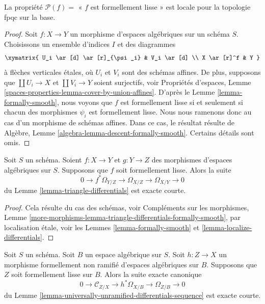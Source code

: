 \begin{lemma}
\label{lemma-descending-property-formally-smooth}
La propriété $\mathcal{P}(f) =$ « $f$ est formellement lisse »
est locale pour la topologie fpqc sur la base.
\end{lemma}

\begin{proof}
Soit $f : X \to Y$ un morphisme d'espaces algébriques sur un schéma $S$.
Choisissons un ensemble d'indices $I$ et des diagrammes
$$
\xymatrix{
U_i \ar[d] \ar[r]_{\psi_i} & V_i \ar[d] \\
X \ar[r]^f & Y
}
$$
à flèches verticales étales, où $U_i$ et $V_i$ sont des schémas affines. De plus,
supposons que $\coprod U_i \to X$ et $\coprod V_i \to Y$ soient surjectifs, voir
Propriétés d'espaces,
Lemme \ref{spaces-properties-lemma-cover-by-union-affines}.
D'après le
Lemme \ref{lemma-formally-smooth},
nous voyons que $f$ est formellement lisse si et seulement si chacun des morphismes
$\psi_i$ est formellement lisse. Nous nous ramenons donc au cas d'un morphisme
de schémas affines. Dans ce cas, le résultat résulte de
Algèbre, Lemme \ref{algebra-lemma-descent-formally-smooth}.
Certains détails sont omis.
\end{proof}

\begin{lemma}
\label{lemma-triangle-differentials-formally-smooth}
Soit $S$ un schéma.
Soient $f : X \to Y$ et $g : Y \to Z$ des morphismes d'espaces algébriques sur $S$.
Supposons que $f$ soit formellement lisse. Alors la suite
$$
0 \to f^*\Omega_{Y/Z} \to \Omega_{X/Z} \to \Omega_{X/Y} \to 0
$$
du Lemme \ref{lemma-triangle-differentials}
est exacte courte.
\end{lemma}

\begin{proof}
Cela résulte du cas des schémas, voir
Compléments sur les morphismes,
Lemme \ref{more-morphisms-lemma-triangle-differentials-formally-smooth},
par localisation étale, voir les
Lemmes \ref{lemma-formally-smooth} et \ref{lemma-localize-differentials}.
\end{proof}

\begin{lemma}
\label{lemma-differentials-formally-unramified-formally-smooth}
Soit $S$ un schéma. Soit $B$ un espace algébrique sur $S$.
Soit $h : Z \to X$ un morphisme formellement non ramifié d'espaces algébriques
sur $B$.
Supposons que $Z$ soit formellement lisse sur $B$. Alors la
suite exacte canonique
$$
0 \to \mathcal{C}_{Z/X} \to h^*\Omega_{X/B} \to \Omega_{Z/B} \to 0
$$
du
Lemme \ref{lemma-universally-unramified-differentials-sequence}
est exacte courte.
\end{lemma}

